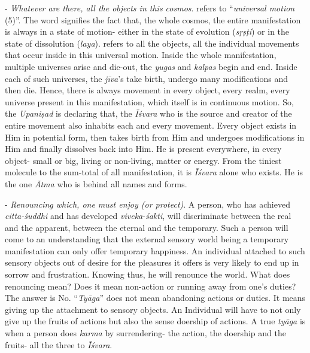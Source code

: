 - \emph{Whatever are there, all the objects in this cosmos}.  refers to ``\emph{universal motion} (5)''. The word signifies the fact that, the whole cosmos, the entire manifestation is always in a state of motion- either in the state of evolution (\emph{sṛṣṭi}) or in the state of dissolution (\emph{laya}).  refers to all the objects, all the individual movements that occur inside in this universal motion. Inside the whole manifestation, multiple universes arise and die-out, the \emph{yugas} and \emph{kalpas} begin and end. Inside each of such universes, the \emph{jīva}'s take birth, undergo many modifications and then die. Hence, there is always movement in every object, every realm, every universe present in this manifestation, which itself is in continuous motion. So, the \emph{Upaniṣad} is declaring that, the \emph{Īśvara} who is the source and creator of the entire movement also inhabits each and every movement. Every object exists in Him in potential form, then takes birth from Him and undergoes modifications in Him and finally dissolves back into Him. He is present everywhere, in every object- small or big, living or non-living, matter or energy. From the tiniest molecule to the sum-total of all manifestation, it is \emph{Īśvara} alone who exists. He is the one \emph{Ātma} who is behind all names and forms.

- \emph{Renouncing which, one must enjoy (or protect)}. A person, who has achieved \emph{citta-śuddhi} and has developed \emph{viveka}-\emph{śakti}, will discriminate between the real and the apparent, between the eternal and the temporary. Such a person will come to an understanding that the external sensory world being a temporary manifestation can only offer temporary happiness. An individual attached to such sensory objects out of desire for the pleasures it offers is very likely to end up in sorrow and frustration. Knowing thus, he will renounce the world. What does renouncing mean? Does it mean non-action or running away from one's duties? The answer is No. ``\emph{Tyāga}'' does not mean abandoning actions or duties. It means giving up the attachment to sensory objects. An Individual will have to not only give up the fruits of actions but also the sense doership of actions. A true \emph{tyāga} is when a person does \emph{karma} by surrendering- the action, the doership and the fruits- all the three to \emph{Īśvara}.

